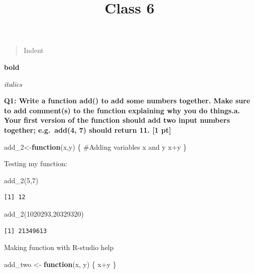 \documentclass[
  letterpaper,
  DIV=11,
  numbers=noendperiod]{scrartcl}
\title{Class 6}
\author{}
\date{}
\newenvironment{Shaded}{\begin{snugshade}}{\end{snugshade}}
\newcommand{\CommentTok}[1]{\textcolor[rgb]{0.37,0.37,0.37}{#1}}
\newcommand{\ControlFlowTok}[1]{\textcolor[rgb]{0.00,0.23,0.31}{\textbf{#1}}}
\newcommand{\DecValTok}[1]{\textcolor[rgb]{0.68,0.00,0.00}{#1}}
\newcommand{\FunctionTok}[1]{\textcolor[rgb]{0.28,0.35,0.67}{#1}}
\newcommand{\NormalTok}[1]{\textcolor[rgb]{0.00,0.23,0.31}{#1}}
\newcommand{\OtherTok}[1]{\textcolor[rgb]{0.00,0.23,0.31}{#1}}
\newcommand{\SpecialCharTok}[1]{\textcolor[rgb]{0.37,0.37,0.37}{#1}}
\begin{document}
\maketitle


\begin{quote}
Indent
\end{quote}

\textbf{bold}

\emph{italics}

\textbf{Q1: Write a function add() to add some numbers together. Make
sure to add comment(s) to the function explaining why you do things.a.
Your first version of the function should add two input numbers
together; e.g.~add(4, 7) should return 11. {[}1 pt{]}}

\begin{Shaded}
\begin{Highlighting}[]
\NormalTok{add\_2}\OtherTok{\textless{}{-}}\ControlFlowTok{function}\NormalTok{(x,y) \{}
  \CommentTok{\#Adding variables x and y}
\NormalTok{  x}\SpecialCharTok{+}\NormalTok{y}
\NormalTok{\}}
\end{Highlighting}
\end{Shaded}

Testing my function:

\begin{Shaded}
\begin{Highlighting}[]
\FunctionTok{add\_2}\NormalTok{(}\DecValTok{5}\NormalTok{,}\DecValTok{7}\NormalTok{)}
\end{Highlighting}
\end{Shaded}

\begin{verbatim}
[1] 12
\end{verbatim}

\begin{Shaded}
\begin{Highlighting}[]
\FunctionTok{add\_2}\NormalTok{(}\DecValTok{1020293}\NormalTok{,}\DecValTok{20329320}\NormalTok{)}
\end{Highlighting}
\end{Shaded}

\begin{verbatim}
[1] 21349613
\end{verbatim}

Making function with R-studio help

\begin{Shaded}
\begin{Highlighting}[]
\NormalTok{add\_two }\OtherTok{\textless{}{-}} \ControlFlowTok{function}\NormalTok{(x, y) \{}
\NormalTok{  x}\SpecialCharTok{+}\NormalTok{y}
\NormalTok{\}}
\end{Highlighting}
\end{Shaded}
\end{document}
